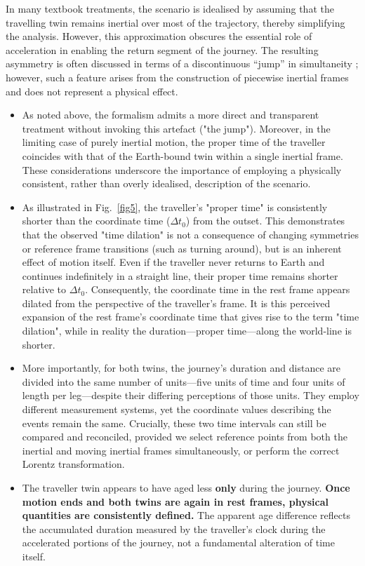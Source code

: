 \documentclass[a4paper,fleqn]{cas-sc}
\begin{document}
	In many textbook treatments, the scenario is idealised by assuming that the travelling twin remains inertial over most of the trajectory, thereby simplifying the analysis. However, this approximation obscures the essential role of acceleration in enabling the return segment of the journey. The resulting asymmetry is often discussed in terms of a discontinuous “jump” in simultaneity \cite{rindler2006}; however, such a feature arises from the construction of piecewise inertial frames and does not represent a physical effect.
		\begin{itemize}
			\item As noted above, the formalism admits a more direct and transparent treatment without invoking this artefact ("the jump"). Moreover, in the limiting case of purely inertial motion, the proper time of the traveller coincides with that of the Earth-bound twin within a single inertial frame. These considerations underscore the importance of employing a physically consistent, rather than overly idealised, description of the scenario.
			\item As illustrated in Fig.~\ref{fig5}, the traveller's "proper time" is consistently shorter than the coordinate time ($\Delta t_0$) from the outset. This demonstrates that the observed "time dilation" is not a consequence of changing symmetries or reference frame transitions (such as turning around), but is an inherent effect of motion itself. Even if the traveller never returns to Earth and continues indefinitely in a straight line, their proper time remains shorter relative to $\Delta t_0$.
	Consequently, the coordinate time in the rest frame appears dilated from the perspective of the traveller's frame. It is this perceived expansion of the rest frame's coordinate time that gives rise to the term "time dilation", while in reality the duration—proper time—along the world-line is shorter. 
			\item More importantly, for both twins, the journey's duration and distance are divided into the same number of units—five units of time and four units of length per leg—despite their differing perceptions of those units. They employ different measurement systems, yet the coordinate values describing the events remain the same. Crucially, these two time intervals can still be compared and reconciled, provided we select reference points from both the inertial and moving inertial frames simultaneously, or perform the correct Lorentz transformation.
 			\item The traveller twin appears to have aged less \textbf{only} during the journey. \textbf{Once motion ends and both twins are again in rest frames, physical quantities are consistently defined.} The apparent age difference reflects the accumulated duration measured by the traveller's clock during the accelerated portions of the journey, not a fundamental alteration of time itself.

\end{itemize}
\end{document}
